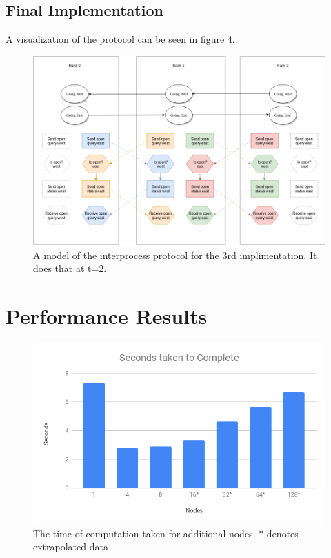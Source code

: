 \documentclass[10pt,a4paper]{article}
\begin{document}
\subsection{Final Implementation}
A visualization of the protocol can be seen in figure 4.

\begin{figure}
    \centering
    \includegraphics[scale=0.4]{imp3_diag.png}
    \caption{A model of the interprocess protocol for the 3rd implimentation. It does that at t=2.}
    \label{fig:my_label}
\end{figure}

\section{Performance Results}

\begin{figure}[H]
    \centering
    \includegraphics[scale=0.3]{seconds.png}
    \caption{The time of computation taken for additional nodes. * denotes extrapolated data}
    \label{fig:my_label}
\end{figure}
\end{document}
